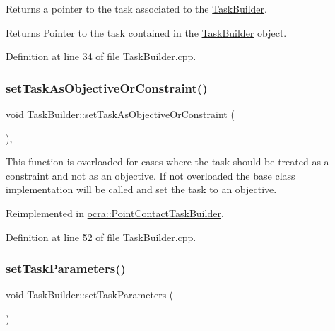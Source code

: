 Returns a pointer to the task associated to the \hyperlink{classocra_1_1TaskBuilder}{Task\+Builder}.

\begin{DoxyReturn}{Returns}
Pointer to the task contained in the \hyperlink{classocra_1_1TaskBuilder}{Task\+Builder} object. 
\end{DoxyReturn}


Definition at line 34 of file Task\+Builder.\+cpp.

\hypertarget{classocra_1_1TaskBuilder_a9e7588983e3adf7f706d122a75e84d05}{}\label{classocra_1_1TaskBuilder_a9e7588983e3adf7f706d122a75e84d05} 
\subsubsection{\texorpdfstring{set\+Task\+As\+Objective\+Or\+Constraint()}{setTaskAsObjectiveOrConstraint()}}
{\footnotesize\ttfamily void Task\+Builder\+::set\+Task\+As\+Objective\+Or\+Constraint (\begin{DoxyParamCaption}{ }\end{DoxyParamCaption})\hspace{0.3cm}{\ttfamily [protected]}, {\ttfamily [virtual]}}

This function is overloaded for cases where the task should be treated as a constraint and not as an objective. If not overloaded the base class implementation will be called and set the task to an objective. 

Reimplemented in \hyperlink{classocra_1_1PointContactTaskBuilder_a729f50dc73c00accb86a9480cb3054fd}{ocra\+::\+Point\+Contact\+Task\+Builder}.



Definition at line 52 of file Task\+Builder.\+cpp.

\hypertarget{classocra_1_1TaskBuilder_a646ca4a01affbb2aa82cfdde32e8be66}{}\label{classocra_1_1TaskBuilder_a646ca4a01affbb2aa82cfdde32e8be66} 
\subsubsection{\texorpdfstring{set\+Task\+Parameters()}{setTaskParameters()}}
{\footnotesize\ttfamily void Task\+Builder\+::set\+Task\+Parameters (\begin{DoxyParamCaption}{ }\end{DoxyParamCaption})}

